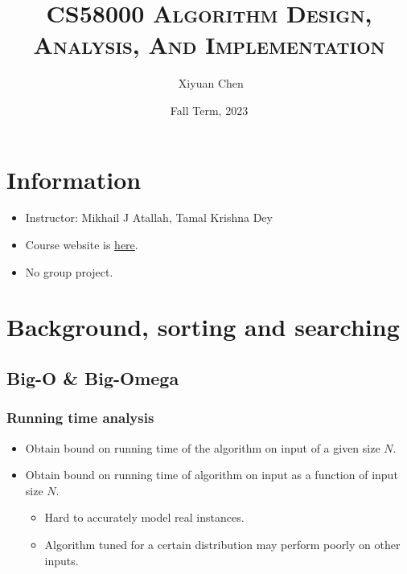 \documentclass{ainote}
\author{\ccLogo \,\,Xiyuan Chen}
\title{\textsc{CS58000 Algorithm Design, Analysis, And Implementation}}
\date{Fall Term, 2023}
\begin{document}
\maketitle
\doclicenseThis
\section*{Information}
\begin{itemize}
    \item Instructor: Mikhail J Atallah, Tamal Krishna Dey
    \item Course website is  \href{https://www.cs.purdue.edu/homes/tamaldey/course/580/}{here}.
    \item No group project.
\end{itemize}
\newpage

\section{Background, sorting and searching}
\subsection{Big-O \& Big-Omega }
\subsubsection{Running time analysis}
\begin{itemize}
    \item {} Obtain bound on  running time of the algorithm on input of a given size $N$.
    \item {} Obtain bound on running time of algorithm on  input as a function of input size $N$.
        \begin{itemize}
            \item Hard to accurately model real instances.
            \item Algorithm tuned for a certain distribution may perform poorly on other inputs.
        \end{itemize}
\end{itemize}
\end{document}
